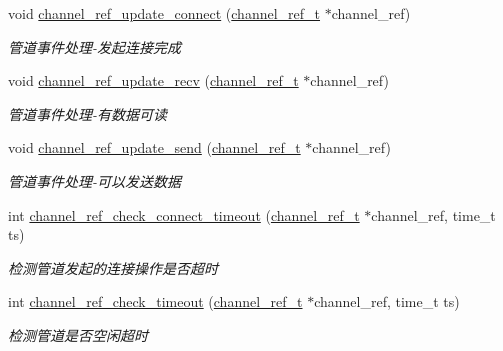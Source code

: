 \begin{DoxyCompactItemize}
void \hyperlink{a00049_ac3dee255a82a9d1fb1fc3c63a2905a5a_ac3dee255a82a9d1fb1fc3c63a2905a5a}{channel\+\_\+ref\+\_\+update\+\_\+connect} (\hyperlink{a00051_a151271c9d188ef28d4d24bb81dcc1263_a151271c9d188ef28d4d24bb81dcc1263}{channel\+\_\+ref\+\_\+t} $\ast$channel\+\_\+ref)
\begin{DoxyCompactList}\small\item\em 管道事件处理-\/发起连接完成 \end{DoxyCompactList}\item 
void \hyperlink{a00049_a1c47df1906826a2a5b6d99fbc51918d1_a1c47df1906826a2a5b6d99fbc51918d1}{channel\+\_\+ref\+\_\+update\+\_\+recv} (\hyperlink{a00051_a151271c9d188ef28d4d24bb81dcc1263_a151271c9d188ef28d4d24bb81dcc1263}{channel\+\_\+ref\+\_\+t} $\ast$channel\+\_\+ref)
\begin{DoxyCompactList}\small\item\em 管道事件处理-\/有数据可读 \end{DoxyCompactList}\item 
void \hyperlink{a00049_ae7b781b5faec09b7bd383e4e59dfb40f_ae7b781b5faec09b7bd383e4e59dfb40f}{channel\+\_\+ref\+\_\+update\+\_\+send} (\hyperlink{a00051_a151271c9d188ef28d4d24bb81dcc1263_a151271c9d188ef28d4d24bb81dcc1263}{channel\+\_\+ref\+\_\+t} $\ast$channel\+\_\+ref)
\begin{DoxyCompactList}\small\item\em 管道事件处理-\/可以发送数据 \end{DoxyCompactList}\item 
int \hyperlink{a00049_a1f03dc2b266c99aa3189dbe02564be45_a1f03dc2b266c99aa3189dbe02564be45}{channel\+\_\+ref\+\_\+check\+\_\+connect\+\_\+timeout} (\hyperlink{a00051_a151271c9d188ef28d4d24bb81dcc1263_a151271c9d188ef28d4d24bb81dcc1263}{channel\+\_\+ref\+\_\+t} $\ast$channel\+\_\+ref, time\+\_\+t ts)
\begin{DoxyCompactList}\small\item\em 检测管道发起的连接操作是否超时 \end{DoxyCompactList}\item 
int \hyperlink{a00049_ae0c46cab3e683bce5f93d07847db7ec1_ae0c46cab3e683bce5f93d07847db7ec1}{channel\+\_\+ref\+\_\+check\+\_\+timeout} (\hyperlink{a00051_a151271c9d188ef28d4d24bb81dcc1263_a151271c9d188ef28d4d24bb81dcc1263}{channel\+\_\+ref\+\_\+t} $\ast$channel\+\_\+ref, time\+\_\+t ts)
\begin{DoxyCompactList}\small\item\em 检测管道是否空闲超时 \end{DoxyCompactList}\item 

\end{DoxyCompactItemize}
